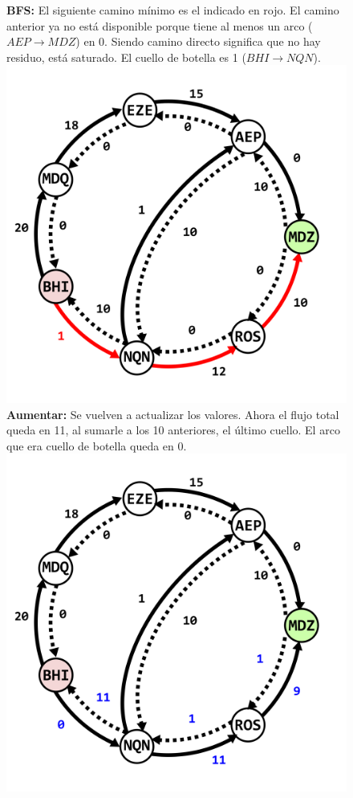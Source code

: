 \documentclass[../tp3_grupo404.tex]{subfiles}
\begin{document}
    \begin{figure}[H]
    \centering
    \subcaptionbox
        {\label{fig:Vuelos5}\textbf{BFS:} El siguiente camino mínimo es el indicado en rojo. El camino anterior
        ya no está disponible porque tiene al menos un arco ($AEP\rightarrow MDZ$) en 0. Siendo camino directo
        significa que no hay residuo, está saturado. El cuello de botella es 1 ($BHI\rightarrow NQN$).}
        {\includegraphics[width=0.4\linewidth,angle=0,origin=c]{out/ejA5.png}}
    \subcaptionbox
        {\label{fig:Vuelos6}\textbf{Aumentar:} Se vuelven a actualizar los valores. Ahora el flujo total queda en 11,
        al sumarle a los 10 anteriores, el último cuello. El arco que era cuello de botella queda en 0.}
        {\includegraphics[width=0.4\linewidth,angle=0,origin=c]{out/ejA6.png}}
    \end{figure}
\end{document}
